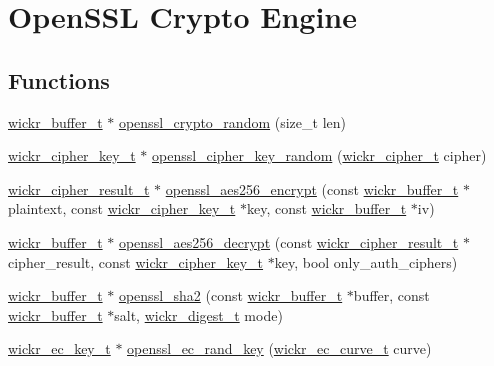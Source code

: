 \hypertarget{group__openssl__crypto}{}\section{Open\+S\+SL Crypto Engine}
\label{group__openssl__crypto}
\subsection*{Functions}
\begin{DoxyCompactItemize}
\item 
\hyperlink{structwickr__buffer}{wickr\+\_\+buffer\+\_\+t} $\ast$ \hyperlink{group__openssl__crypto_gadfe740d19f9f2096b818553e90dae0d7}{openssl\+\_\+crypto\+\_\+random} (size\+\_\+t len)
\item 
\hyperlink{structwickr__cipher__key}{wickr\+\_\+cipher\+\_\+key\+\_\+t} $\ast$ \hyperlink{group__openssl__crypto_ga9177055e488f0163d3eb946799df5a67}{openssl\+\_\+cipher\+\_\+key\+\_\+random} (\hyperlink{structwickr__cipher}{wickr\+\_\+cipher\+\_\+t} cipher)
\item 
\hyperlink{structwickr__cipher__result}{wickr\+\_\+cipher\+\_\+result\+\_\+t} $\ast$ \hyperlink{group__openssl__crypto_ga528fe693df65582a58d10b9cae0757a7}{openssl\+\_\+aes256\+\_\+encrypt} (const \hyperlink{structwickr__buffer}{wickr\+\_\+buffer\+\_\+t} $\ast$plaintext, const \hyperlink{structwickr__cipher__key}{wickr\+\_\+cipher\+\_\+key\+\_\+t} $\ast$key, const \hyperlink{structwickr__buffer}{wickr\+\_\+buffer\+\_\+t} $\ast$iv)
\item 
\hyperlink{structwickr__buffer}{wickr\+\_\+buffer\+\_\+t} $\ast$ \hyperlink{group__openssl__crypto_gac3650e924145a56ac236b6ce3e1bc9d9}{openssl\+\_\+aes256\+\_\+decrypt} (const \hyperlink{structwickr__cipher__result}{wickr\+\_\+cipher\+\_\+result\+\_\+t} $\ast$cipher\+\_\+result, const \hyperlink{structwickr__cipher__key}{wickr\+\_\+cipher\+\_\+key\+\_\+t} $\ast$key, bool only\+\_\+auth\+\_\+ciphers)
\item 
\hyperlink{structwickr__buffer}{wickr\+\_\+buffer\+\_\+t} $\ast$ \hyperlink{group__openssl__crypto_ga19991a9b00d0c383c64935fa2acecda7}{openssl\+\_\+sha2} (const \hyperlink{structwickr__buffer}{wickr\+\_\+buffer\+\_\+t} $\ast$buffer, const \hyperlink{structwickr__buffer}{wickr\+\_\+buffer\+\_\+t} $\ast$salt, \hyperlink{structwickr__digest}{wickr\+\_\+digest\+\_\+t} mode)
\item 
\hyperlink{structwickr__ec__key}{wickr\+\_\+ec\+\_\+key\+\_\+t} $\ast$ \hyperlink{group__openssl__crypto_ga75a01a740d558bfcc0f10920266cd9d5}{openssl\+\_\+ec\+\_\+rand\+\_\+key} (\hyperlink{structwickr__ec__curve}{wickr\+\_\+ec\+\_\+curve\+\_\+t} curve)

\end{DoxyCompactItemize}
